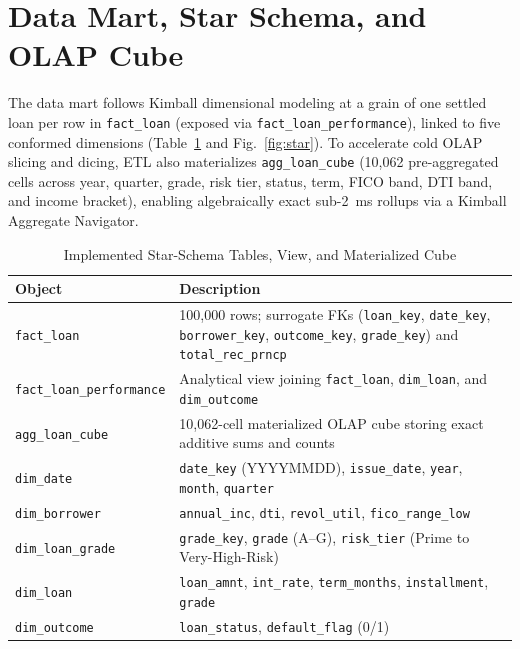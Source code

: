 \documentclass[conference]{IEEEtran}
\begin{document}
\section{Data Mart, Star Schema, and OLAP Cube}
The data mart follows Kimball dimensional modeling \cite{kimball} at a grain of one settled loan per row in \texttt{fact\_loan} (exposed via \texttt{fact\_loan\_performance}), linked to five conformed dimensions (Table~\ref{tab:star} and Fig.~\ref{fig:star}). To accelerate cold OLAP slicing and dicing, ETL also materializes \texttt{agg\_loan\_cube} (10,062 pre-aggregated cells across year, quarter, grade, risk tier, status, term, FICO band, DTI band, and income bracket), enabling algebraically exact sub-2~ms rollups via a Kimball Aggregate Navigator.
\begin{table}[!t]
\caption{Implemented Star-Schema Tables, View, and Materialized Cube}
\label{tab:star}
\centering
\begin{tabularx}{\columnwidth}{@{}l X@{}}
\toprule
\textbf{Object} & \textbf{Description}\\
\midrule
\texttt{fact\_loan} & 100,000 rows; surrogate FKs (\texttt{loan\_key}, \texttt{date\_key}, \texttt{borrower\_key}, \texttt{outcome\_key}, \texttt{grade\_key}) and \texttt{total\_rec\_prncp}\\
\texttt{fact\_loan\_performance} & Analytical view joining \texttt{fact\_loan}, \texttt{dim\_loan}, and \texttt{dim\_outcome}\\
\texttt{agg\_loan\_cube} & 10,062-cell materialized OLAP cube storing exact additive sums and counts\\
\texttt{dim\_date} & \texttt{date\_key} (YYYYMMDD), \texttt{issue\_date}, \texttt{year}, \texttt{month}, \texttt{quarter}\\
\texttt{dim\_borrower} & \texttt{annual\_inc}, \texttt{dti}, \texttt{revol\_util}, \texttt{fico\_range\_low}\\
\texttt{dim\_loan\_grade} & \texttt{grade\_key}, \texttt{grade} (A--G), \texttt{risk\_tier} (Prime to Very-High-Risk)\\
\texttt{dim\_loan} & \texttt{loan\_amnt}, \texttt{int\_rate}, \texttt{term\_months}, \texttt{installment}, \texttt{grade}\\
\texttt{dim\_outcome} & \texttt{loan\_status}, \texttt{default\_flag} (0/1)\\
\bottomrule
\end{tabularx}
\end{table}
\end{document}
